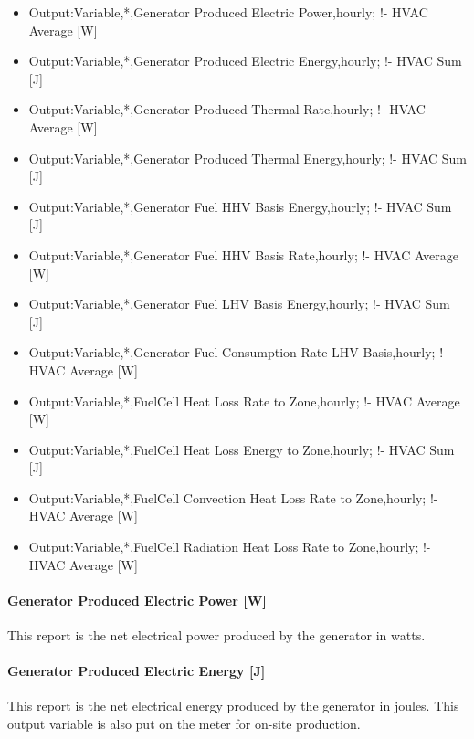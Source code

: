\begin{itemize}
\item
  Output:Variable,*,Generator Produced Electric Power,hourly; !- HVAC Average {[}W{]}
\item
  Output:Variable,*,Generator Produced Electric Energy,hourly; !- HVAC Sum {[}J{]}
\item
  Output:Variable,*,Generator Produced Thermal Rate,hourly; !- HVAC Average {[}W{]}
\item
  Output:Variable,*,Generator Produced Thermal Energy,hourly; !- HVAC Sum {[}J{]}
\item
  Output:Variable,*,Generator Fuel HHV Basis Energy,hourly; !- HVAC Sum {[}J{]}
\item
  Output:Variable,*,Generator Fuel HHV Basis Rate,hourly; !- HVAC Average {[}W{]}
\item
  Output:Variable,*,Generator Fuel LHV Basis Energy,hourly; !- HVAC Sum {[}J{]}
\item
  Output:Variable,*,Generator Fuel Consumption Rate LHV Basis,hourly; !- HVAC Average {[}W{]}
\item
  Output:Variable,*,FuelCell Heat Loss Rate to Zone,hourly; !- HVAC Average {[}W{]}
\item
  Output:Variable,*,FuelCell Heat Loss Energy to Zone,hourly; !- HVAC Sum {[}J{]}
\item
  Output:Variable,*,FuelCell Convection Heat Loss Rate to Zone,hourly; !- HVAC Average {[}W{]}
\item
  Output:Variable,*,FuelCell Radiation Heat Loss Rate to Zone,hourly; !- HVAC Average {[}W{]}
\end{itemize}

\paragraph{Generator Produced Electric Power {[}W{]}}\label{generator-produced-electric-power-w-3}

This report is the net electrical power produced by the generator in watts.

\paragraph{Generator Produced Electric Energy {[}J{]}}\label{generator-produced-electric-energy-j-3}

This report is the net electrical energy produced by the generator in joules. This output variable is also put on the meter for on-site production.

